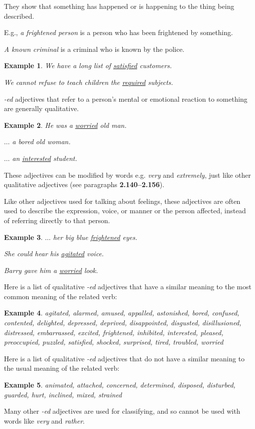 \documentclass[oneside]{book}
\numberwithin{equation}{section}
\newtheorem{example}{Example}[section]
\begin{document}
They show that something has happened or is happening to the thing being described.

E.g., \textit{a frightened person} is a person who has been frightened by something.

\textit{A known criminal} is a criminal who is known by the police.
\begin{example}
    We have a long list of \underline{satisfied} customers.
    
    We cannot refuse to teach children the \underline{required} subjects.
\end{example}
%
\noindent{} \textit{-ed} adjectives that refer to a person's mental or emotional reaction to something are generally qualitative.
\begin{example}
    He was a \underline{worried} old man.
    
    $\ldots$ a bored old woman.
    
    $\ldots$ an \underline{interested} student.
\end{example}
These adjectives can be modified by words e.g. \textit{very} and \textit{extremely}, just like other qualitative adjectives (see paragraphs \textbf{2.140--2.156}).

%
\noindent{} Like other adjectives used for talking about feelings, these adjectives are often used to describe the expression, voice, or manner or the person affected, instead of referring directly to that person.
\begin{example}
    $\ldots$ her big blue \underline{frightened} eyes.
    
    She could hear his \underline{agitated} voice.
    
    Barry gave him a \underline{worried} look.
\end{example}
%
\noindent{} Here is a list of qualitative \textit{-ed} adjectives that have a similar meaning to the most common meaning of the related verb:
\begin{example}
    agitated, alarmed, amused, appalled, astonished, bored, confused, contented, delighted, depressed, deprived, disappointed, disgusted, disillusioned, distressed, embarrassed, excited, frightened, inhibited, interested, pleased, preoccupied, puzzled, satisfied, shocked, surprised, tired, troubled, worried
\end{example}
Here is a list of qualitative \textit{-ed} adjectives that do not have a similar meaning to the usual meaning of the related verb:
\begin{example}
    animated, attached, concerned, determined, disposed, disturbed, guarded, hurt, inclined, mixed, strained
\end{example}
%
\noindent{} Many other \textit{-ed} adjectives are used for classifying, and so cannot be used with words like \textit{very} and \textit{rather}.
\end{document}
